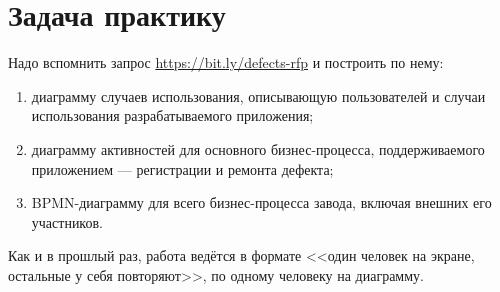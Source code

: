 \documentclass{../../text-style}
\begin{document}
\maketitle
\thispagestyle{empty}

\section{Задача практику}

Надо вспомнить запрос \url{https://bit.ly/defects-rfp} и построить по нему:

\begin{enumerate}
    \item диаграмму случаев использования, описывающую пользователей и случаи использования разрабатываемого приложения;
    \item диаграмму активностей для основного бизнес-процесса, поддерживаемого приложением --- регистрации и ремонта дефекта;
    \item BPMN-диаграмму для всего бизнес-процесса завода, включая внешних его участников.
\end{enumerate}

Как и в прошлый раз, работа ведётся в формате <<один человек на экране, остальные у себя повторяют>>, по одному человеку на диаграмму.
\end{document}
